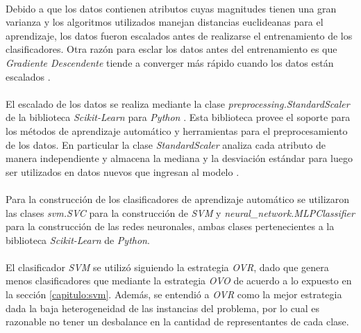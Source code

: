 \paragraph{} Debido a que los datos contienen atributos cuyas magnitudes tienen una gran varianza y los algoritmos utilizados manejan distancias euclideanas para el aprendizaje, los datos fueron escalados antes de realizarse el entrenamiento de los clasificadores.
Otra razón para esclar los datos antes del entrenamiento es que \textit{Gradiente Descendente} tiende a converger más rápido cuando los datos están escalados \cite{gradiente-descendente-escalado}.

\paragraph{} El escalado de los datos se realiza mediante la clase \textit{preprocessing.StandardScaler} de la biblioteca \textit{Scikit-Learn} para \textit{Python} \cite{scikit-learn}.
Esta biblioteca provee el soporte para los métodos de aprendizaje automático y herramientas para el preprocesamiento de los datos.
En particular la clase \textit{StandardScaler} analiza cada atributo de manera independiente y almacena la mediana y la desviación estándar para luego ser utilizados en datos nuevos que ingresan al modelo \cite{StandardScaler-scikit-learn}.

\paragraph{} Para la construcción de los clasificadores de aprendizaje automático se utilizaron las clases \textit{svm.SVC} para la construcción de \textit{SVM} y \textit{neural\_network.MLPClassifier} para la construcción de las redes neuronales, ambas clases pertenecientes a la biblioteca \textit{Scikit-Learn} de \textit{Python}.

\paragraph{} El clasificador \textit{SVM} se utilizó siguiendo la estrategia \textit{OVR}, dado que genera menos clasificadores que mediante la estrategia \textit{OVO} de acuerdo a lo expuesto en la sección \ref{capitulo:svm}.
Además, se entendió a \textit{OVR} como la mejor estrategia dada la baja heterogeneidad de las instancias del problema, por lo cual es razonable no tener un desbalance en la cantidad de representantes de cada clase.

